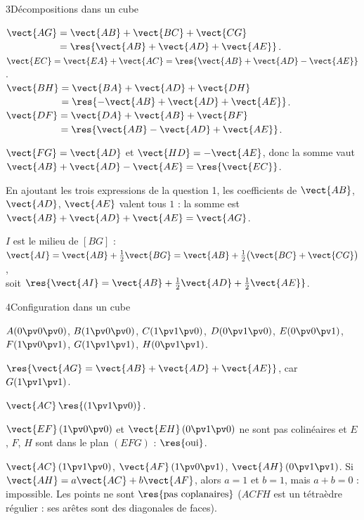 \begin{deuxcolonnes}
\begin{corrige}{3}{Décompositions dans un cube}
\begin{questions}
  \item $\vect{AG}=\vect{AB}+\vect{BC}+\vect{CG}$\\ $\phantom{\vect{AG}}=\res{\vect{AB}+\vect{AD}+\vect{AE}}$.\\
    $\vect{EC}=\vect{EA}+\vect{AC}=\res{\vect{AB}+\vect{AD}-\vect{AE}}$.\\
    $\vect{BH}=\vect{BA}+\vect{AD}+\vect{DH}$\\ $\phantom{\vect{BH}}=\res{-\vect{AB}+\vect{AD}+\vect{AE}}$.\\
    $\vect{DF}=\vect{DA}+\vect{AB}+\vect{BF}$\\ $\phantom{\vect{DF}}=\res{\vect{AB}-\vect{AD}+\vect{AE}}$.
  \item $\vect{FG}=\vect{AD}$ et $\vect{HD}=-\vect{AE}$, donc la somme vaut $\vect{AB}+\vect{AD}-\vect{AE}=\res{\vect{EC}}$.
  \item En ajoutant les trois expressions de la question 1, les coefficients de $\vect{AB}$, $\vect{AD}$, $\vect{AE}$ valent
    tous $1$ : la somme est $\vect{AB}+\vect{AD}+\vect{AE}=\vect{AG}$.
  \item $I$ est le milieu de $[BG]$ :\\ $\vect{AI}=\vect{AB}+\frac12\vect{BG}=\vect{AB}+\frac12\big(\vect{BC}+\vect{CG}\big)$,\\
    soit $\res{\vect{AI}=\vect{AB}+\tfrac12\vect{AD}+\tfrac12\vect{AE}}$.
\end{questions}
\end{corrige}

\begin{corrige}{4}{Configuration dans un cube}
\begin{questions}
  \item $A(0\pv0\pv0)$, $B(1\pv0\pv0)$, $C(1\pv1\pv0)$, $D(0\pv1\pv0)$, $E(0\pv0\pv1)$, $F(1\pv0\pv1)$, $G(1\pv1\pv1)$,
    $H(0\pv1\pv1)$.
  \item $\res{\vect{AG}=\vect{AB}+\vect{AD}+\vect{AE}}$, car $G(1\pv1\pv1)$.
  \item $\vect{AC}\,\res{(1\pv1\pv0)}$.
  \item $\vect{EF}\,(1\pv0\pv0)$ et $\vect{EH}\,(0\pv1\pv0)$ ne sont pas colinéaires et $E$, $F$, $H$ sont dans le plan $(EFG)$ :
    $\res{\text{oui}}$.
  \item $\vect{AC}\,(1\pv1\pv0)$, $\vect{AF}\,(1\pv0\pv1)$, $\vect{AH}\,(0\pv1\pv1)$. Si $\vect{AH}=a\vect{AC}+b\vect{AF}$, alors
    $a=1$ et $b=1$, mais $a+b=0$ : impossible. Les points ne sont $\res{\text{pas coplanaires}}$ ($ACFH$ est un tétraèdre
    régulier : ses arêtes sont des diagonales de faces).
\end{questions}
\end{corrige}


\end{deuxcolonnes}
